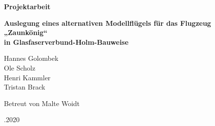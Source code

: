 
\begin{center}
\begin{huge}
	\par\bigskip
	\par\bigskip
	\par\bigskip
	\par\bigskip	
	\par\bigskip
	\par\bigskip	
	\textbf{Projektarbeit}\\
	\par\bigskip
	\par\bigskip	
	\par\bigskip
	\par\bigskip	
	\textbf{Auslegung eines alternativen Modellflügels für das Flugzeug „Zaunkönig“} \\
	\textbf{in Glasfaserverbund-Holm-Bauweise}\\
	\par\bigskip
	\par\bigskip
	
	\end{huge}

	\par\bigskip
\par\bigskip	
\par\bigskip
\par\bigskip
	\par\bigskip
\par\bigskip	
\par\bigskip
\par\bigskip	
	\par\bigskip
\par\bigskip	
\par\bigskip
\par\bigskip	

Hannes Golombek\\
Ole Scholz\\
Henri Kammler\\
Tristan Brack\\
\par\bigskip
\par\bigskip	
\par\bigskip

Betreut von Malte Woidt\\
\par\bigskip
\par\bigskip	
\par\bigskip
\par\bigskip	
\par\bigskip
\par{}.2020\\
\end{center}

